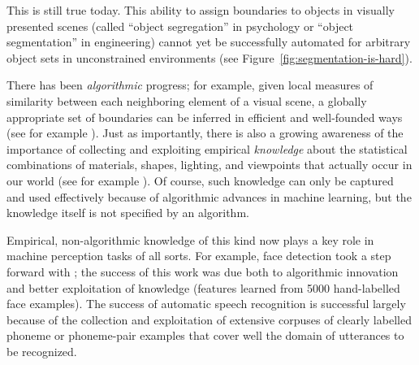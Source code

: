 \noindent
This is still true today.  This ability 
to assign
boundaries to objects in visually presented scenes 
(called ``object segregation''
in psychology or ``object segmentation'' in engineering) cannot yet be
successfully automated for arbitrary object sets in unconstrained
environments (see Figure~\ref{fig:segmentation-is-hard}).

There has been {\em algorithmic} progress; for
example, given local measures of similarity between each neighboring
element of a visual scene, a globally appropriate set of boundaries
can be inferred in efficient and well-founded ways (see for example
).
%
%
Just as importantly, there is also a growing awareness of the
importance of collecting and exploiting empirical {\em knowledge}
about the statistical combinations of materials, shapes, lighting, and
viewpoints that actually occur in our world (see for example
).  Of course, such knowledge can only be
captured and used effectively because of algorithmic advances in
machine learning, but the knowledge itself is not specified by an
algorithm.

Empirical, non-algorithmic knowledge of this kind now plays a key role
in machine perception tasks of all sorts.
%
For example, face detection took a step forward with
; the success of this work was due both to
algorithmic innovation and better exploitation of knowledge (features
learned from 5000 hand-labelled face examples).
%
The success of automatic speech recognition is successful largely
because of the collection and exploitation of extensive corpuses of
clearly labelled phoneme or phoneme-pair examples that cover well the
domain of utterances to be recognized.
%

